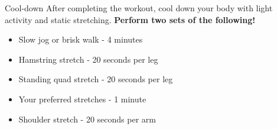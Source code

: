 \documentclass{article}
\newcounter{workout}
\begin{document}
	\begin{workoutbox}{Cool-down}
		After completing the workout, cool down your body with light activity and static stretching. \textbf{Perform two sets of the following!}
		
		\begin{itemize}[label=\textcolor{blue!70}{\textbullet}, itemsep=0pt]
			\item Slow jog or brisk walk - 4 minutes
			\item Hamstring stretch - 20 seconds per leg
			\item Standing quad stretch - 20 seconds per leg
			\item Your preferred stretches - 1 minute
			\item Shoulder stretch - 20 seconds per arm
		\end{itemize}
	\end{workoutbox}
	
\end{document}
